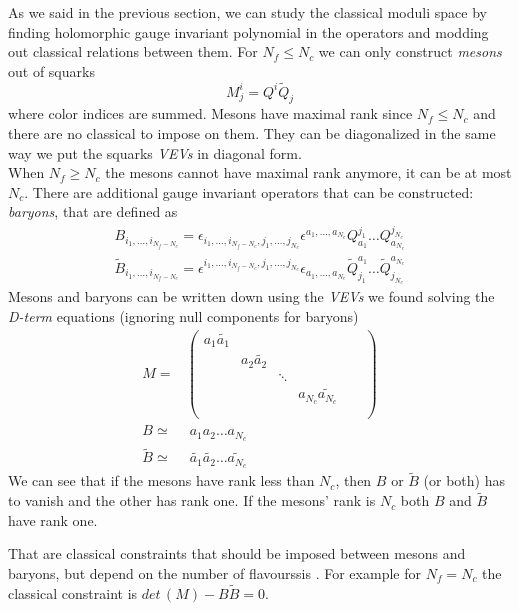 As we said in the previous section, we can  study the classical moduli space by finding holomorphic gauge invariant polynomial in the operators and modding out classical relations between them.
For $N_f \le N_c$ we can only construct \emph{mesons} out of squarks
\begin{equation}
  M^i_j = Q^i \tilde{Q}_j
 \end{equation} 
where color indices are summed. 
Mesons have maximal rank since $N_f \le N_c$ and there are no  classical to impose on them. 
They can be diagonalized in the same way we put the squarks \emph{VEVs} in diagonal form.\\ 
When $N_f \geq N_c$ the mesons cannot have maximal rank anymore, it can be at most $N_c$.
There are additional gauge invariant operators that can be constructed: \emph{baryons}, that are defined as
\begin{align}
 B_{ i_1, \dotsc, i_{N_f - N_c}} = \epsilon_{i_1, \dotsc, i_{N_f - N_c}, j_1 ,\dotsc, j_{N_c}} \epsilon^{a_1 , \dotsc, a_{N_c}} Q^{j_1}_{a_1} \dots Q^{j_{N_c}}_{a_{N_c}}
 \\
 \tilde{B}_{ i_1, \dotsc, i_{N_f - N_c}} = \epsilon^{i_1, \dotsc, i_{N_f - N_c}, j_1 , \dotsc, j_{N_c}} \epsilon_{a_1 , \dotsc, a_{N_c}} \tilde{Q}_{j_1}^{a_1} \dots \tilde{Q}_{j_{N_c}}^{a_{N_c}}
\end{align}
Mesons and baryons can be written down using the \emph{VEVs} we found solving the \emph{D-term} equations (ignoring null components for baryons)
\begin{align}
M =& \begin{pmatrix}
a_1 \tilde{a_1} & & & & & \\
				& a_2 \tilde{a_2}	& 		&		 & & \\
				&				 	& \ddots&		& 	& \\
				&					&		& a_{N_c} \tilde{a_{N_c}} & \\
				& & & & & \\	
\end{pmatrix}
\\
B  \simeq & \;  a_1 a_2 \dots a_{N_c} 
\\
\tilde{B} \simeq & \;  \tilde{a_1} \tilde{a_2}\dots \tilde{a_{N_c}}
\end{align}
We can see that if the mesons have rank less than $N_c$, then $B$ or $\tilde{B}$ (or both) has to vanish and the other has rank one. If the mesons' rank is $N_c$ both $B$ and $\tilde{B}$ have rank one.

That are classical constraints that should be imposed between mesons and baryons, but depend on the number of flavourssis .
For example for $N_f = N_c$ the classical constraint  is $ det \,( M) - B \tilde{B} = 0$.


